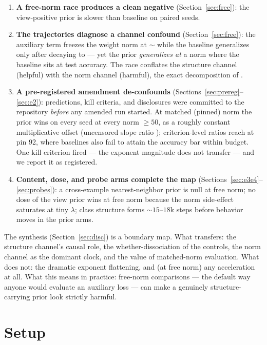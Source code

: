 \documentclass[11pt]{article}
\begin{document}
\begin{enumerate}
\item \textbf{A free-norm race produces a clean negative} (Section~\ref{sec:free}): the
  view-positive prior is slower than baseline on \pfAugSlowCount{} paired seeds.
\item \textbf{The trajectories diagnose a channel confound} (Section~\ref{sec:free}): the
  auxiliary term freezes the weight norm at ${\sim}$\pfAugNormAtGen{} while the baseline generalizes
  only after decaying to \pfBaseNormAtGen{} --- yet the prior \emph{generalizes at} a norm where
  the baseline sits at \pfBaseAccAtHighNorm{} test accuracy. The race conflates the structure
  channel (helpful) with the norm channel (harmful), the exact decomposition of
  \citep{companion2026a}.
\item \textbf{A pre-registered amendment de-confounds} (Sections~\ref{sec:prereg}--\ref{sec:e2}):
  predictions, kill criteria, and disclosures were committed to the repository \emph{before} any
  amended run started. At matched (pinned) norm the prior wins on every seed at every norm
  $\geq 50$, as a roughly constant multiplicative offset (uncensored slope ratio
  \pfSlopeRatioEighty); criterion-level ratios reach \pfRatioCNinetyTwo{} at pin 92, where
  baselines also fail to attain the accuracy bar within budget. One kill criterion fired ---
  the exponent magnitude does not transfer --- and we report it as registered.
\item \textbf{Content, dose, and probe arms complete the map}
  (Sections~\ref{sec:e3e4}--\ref{sec:probes}): a cross-example nearest-neighbor prior is null at
  free norm; no dose of the view prior wins at free norm because the norm side-effect saturates
  at tiny $\lambda$; class structure forms ${\sim}15$--$18$k steps before behavior moves in the
  prior arms.
\end{enumerate}

The synthesis (Section~\ref{sec:disc}) is a boundary map. What transfers: the structure
channel's causal role, the whether-dissociation of the controls, the norm channel as the
dominant clock, and the value of matched-norm evaluation. What does not: the dramatic exponent
flattening, and (at free norm) any acceleration at all. What this means in practice: free-norm
comparisons --- the default way anyone would evaluate an auxiliary loss --- can make a
genuinely structure-carrying prior look strictly harmful.

\section{Setup}
\label{sec:setup}
\end{document}
